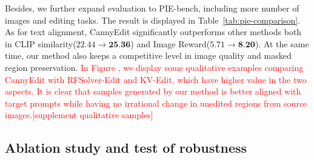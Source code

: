 \documentclass{article}
\begin{document}
Besides, we further expand evaluation to PIE-bench, including more number of images and editing tasks. The result is displayed in Table~\ref{tab:pie-comparison}. As for text alignment, CannyEdit significantly outperforms other methods both in CLIP similarity($22.44\rightarrow \textbf{25.36}$) and Image Reward($5.71\rightarrow \textbf{8.20}$). At the same time, our method also keeps a competitive level in image quality and masked region preservation. \textcolor{red}{In Figure  , we display some qualitative examples comparing CannyEdit with RFSolver-Edit and KV-Edit, which have higher value in the two aspects. It is clear that samples generated by our method is better aligned with target prompts while having no irrational change in unedited regions from source images.[supplement qualitative samples]}

\subsection{Ablation study and test of robustness}
\end{document}
